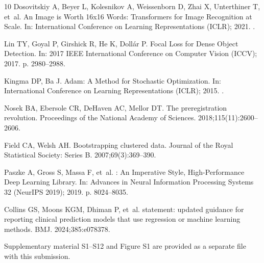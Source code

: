 \documentclass[VANCOUVER,Times1COL]{WileyNJDv5}
\begin{document}
\begin{thebibliography}{10}
Dosovitskiy A, Beyer L, Kolesnikov A, Weissenborn D, Zhai X, Unterthiner T,
  et~al.
\newblock An Image is Worth 16x16 Words: Transformers for Image Recognition at
  Scale.
\newblock In: International Conference on Learning Representations (ICLR);
  2021. .

Lin TY, Goyal P, Girshick R, He K, Doll{\'a}r P.
\newblock Focal Loss for Dense Object Detection.
\newblock In: 2017 IEEE International Conference on Computer Vision (ICCV);
  2017. p. 2980--2988.

Kingma DP, Ba J.
\newblock Adam: A Method for Stochastic Optimization.
\newblock In: International Conference on Learning Representations (ICLR);
  2015. .

Nosek BA, Ebersole CR, DeHaven AC, Mellor DT.
\newblock The preregistration revolution.
\newblock Proceedings of the National Academy of Sciences.
  2018;115(11):2600--2606.

Field CA, Welsh AH.
\newblock Bootstrapping clustered data.
\newblock Journal of the Royal Statistical Society: Series B.
  2007;69(3):369--390.

Paszke A, Gross S, Massa F, et~al.
: An Imperative Style, High-Performance Deep Learning
  Library.
\newblock In: Advances in Neural Information Processing Systems 32 (NeurIPS
  2019); 2019. p. 8024--8035.

Collins GS, Moons KGM, Dhiman P, et~al.
 statement: updated guidance for reporting clinical
  prediction models that use regression or machine learning methods.
\newblock BMJ. 2024;385:e078378.

\end{thebibliography}


Supplementary material S1--S12 and Figure S1 are provided as a separate file with this submission.
\end{document}
